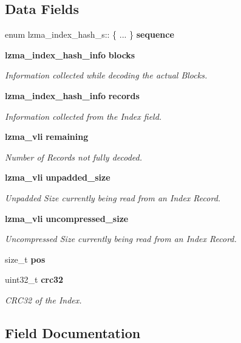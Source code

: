 \subsection*{Data Fields}
\begin{DoxyCompactItemize}
\item 
\mbox{\label{structlzma__index__hash__s_aa3d3ed57a6b0d9162ce567fa09eb57e7}} 
enum lzma\+\_\+index\+\_\+hash\+\_\+s\+:: \{ ... \}  {\bfseries sequence}
\item 
\textbf{ lzma\+\_\+index\+\_\+hash\+\_\+info} \textbf{ blocks}
\begin{DoxyCompactList}\small\item\em Information collected while decoding the actual Blocks. \end{DoxyCompactList}\item 
\textbf{ lzma\+\_\+index\+\_\+hash\+\_\+info} \textbf{ records}
\begin{DoxyCompactList}\small\item\em Information collected from the Index field. \end{DoxyCompactList}\item 
\textbf{ lzma\+\_\+vli} \textbf{ remaining}
\begin{DoxyCompactList}\small\item\em Number of Records not fully decoded. \end{DoxyCompactList}\item 
\textbf{ lzma\+\_\+vli} \textbf{ unpadded\+\_\+size}
\begin{DoxyCompactList}\small\item\em Unpadded Size currently being read from an Index Record. \end{DoxyCompactList}\item 
\textbf{ lzma\+\_\+vli} \textbf{ uncompressed\+\_\+size}
\begin{DoxyCompactList}\small\item\em Uncompressed Size currently being read from an Index Record. \end{DoxyCompactList}\item 
size\+\_\+t \textbf{ pos}
\item 
uint32\+\_\+t \textbf{ crc32}
\begin{DoxyCompactList}\small\item\em C\+R\+C32 of the Index. \end{DoxyCompactList}\end{DoxyCompactItemize}


\subsection{Field Documentation}
\mbox{\label{structlzma__index__hash__s_ab3188a30d1a8ecca8e1be3e4117d247d}} 
